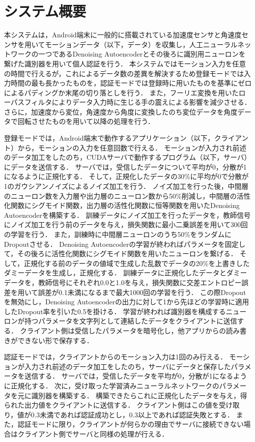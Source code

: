 \section{システム概要}
本システムは，Android端末に一般的に搭載されている加速度センサと角速度センサを用いてモーションデータ（以下，データ）を収集し，人工ニューラルネットワークの一つであるDenoising Autoencoderとその後ろに識別用ニューロンを繋げた識別器を用いて個人認証を行う．
本システムではモーション入力を任意の時間で行えるが，これによるデータ数の差異を解決するため登録モードでは入力時間の最も長かったものを，認証モードでは登録時に用いたものを基準にゼロによるパディングか末尾の切り落としを行う．
また，フーリエ変換を用いたローパスフィルタによりデータ入力時に生じる手の震えによる影響を減少させる．
さらに，加速度から変位，角速度から角度に変換したのち変位データを角度データで回転させたものを用いて以降の処理を行う．

登録モードでは，Android端末で動作するアプリケーション（以下，クライアント）から，モーションの入力を任意回数で行える．
モーションが入力され前述のデータ加工をしたのち，CUDAサーバで動作するプログラム（以下，サーバ）にデータを送信する．
サーバでは，受信したデータについて平均が0，分散が1になるように正規化する．
そして，正規化したデータの30\%に平均が0で分散が1のガウシアンノイズによるノイズ加工を行う．
ノイズ加工を行った後，中間層のニューロン数を入力層や出力層のニューロン数から50\%削減し，中間層の活性化関数にシグモイド関数，出力層の活性化関数に恒等関数を用いたDenoising Autoencoderを構築する．
訓練データにノイズ加工を行ったデータを，教師信号にノイズ加工を行う前のデータを与え，損失関数に最小二乗誤差を用いて300回の学習を行う．
また，訓練時に中間層ニューロンのうち50\%をランダムにDropoutさせる．
Denoising Autoencoderの学習が終わればパラメータを固定して，その後ろに活性化関数にシグモイド関数を用いたニューロンを繋げる．
そして，正規化する前のデータの値域で生成した乱数でデータの20\%を上書きしたダミーデータを生成し，正規化する．
訓練データに正規化したデータとダミーデータを，教師信号にそれぞれ0.0と1.0を与え，損失関数に交差エントロピー誤差を用いて誤差が0.1未満になるまで最大1000回の学習を行う．
この際Dropoutを無効にし，Denoising Autoencoderの出力に対して1から先ほどの学習時に適用したDropout率を引いた0.5を掛ける．
学習が終われば識別器を構成するニューロンが持つパラメータを文字列として連結したデータをクライアントに送信する．
クライアント側は受信したパラメータを暗号化し，他アプリからの読み書きができない形で保存する．

認証モードでは，クライアントからのモーション入力は1回のみ行える．
モーションが入力され前述のデータ加工をしたのち，サーバにデータと保存したパラメータを送信する．
サーバでは，受信したデータを平均が0，分散が1になるように正規化する．
次に，受け取った学習済みニューラルネットワークのパラメータを元に識別器を構築する．
構築できたらこれに正規化したデータを与え，得られた出力値をクライアントに送信する．
クライアント側はこの値を受け取り，値が0.3未満であれば認証成功とし，0.3以上であれば認証失敗とする．
また，認証モードに限り，クライアントが何らかの理由でサーバに接続できない場合はクライアント側でサーバと同様の処理が行える．
